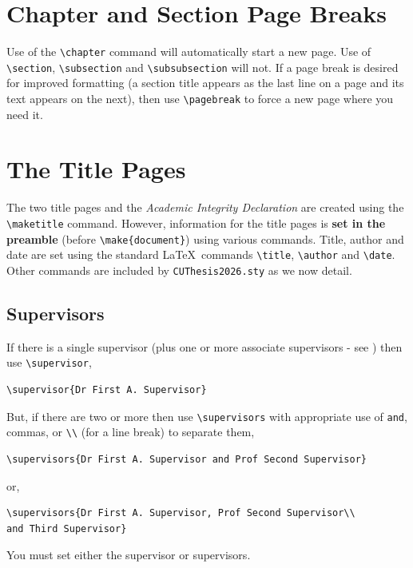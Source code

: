 \documentclass[12pt,oneside]{book} %
\begin{document}
\section{Chapter and Section Page Breaks}
\label{sec:ChapSecBreaks}
Use of the \verb#\chapter# command will automatically start a new page. Use of \verb#\section#, \verb#\subsection#  and \verb#\subsubsection# will not. If a page break is desired for improved formatting (\eg a section title appears as the last line on a page and its text appears on the next), then use \verb#\pagebreak# to force a new page where you need it.  

\section{The Title Pages}
\label{sec:TitlePages}
The two title pages and the {\em Academic Integrity Declaration} are created using the \linebreak\verb#\maketitle# command.  However, information for the title pages is \textbf{set in the preamble} (before \verb#\make{document}#) using various commands. Title, author and date are set  using the standard \LaTeX\ commands \verb#\title#, \verb#\author# and \verb#\date#. Other commands are included by \verb#CUThesis2026.sty# as we now detail.

\subsection{Supervisors}
\label{sec:Supervisor}
If there is a single supervisor (plus one or more associate supervisors - see ) then use \verb#\supervisor#,
\begin{verbatim}
\supervisor{Dr First A. Supervisor}
\end{verbatim}
But, if there are two or more then use \verb#\supervisors# with appropriate use of {\tt and}, commas, or \verb#\\# (for a line break)  to separate them,
\begin{verbatim}
\supervisors{Dr First A. Supervisor and Prof Second Supervisor}
\end{verbatim}
or,
\begin{verbatim}
\supervisors{Dr First A. Supervisor, Prof Second Supervisor\\ 
and Third Supervisor}
\end{verbatim}
You must set either the supervisor or supervisors. 
\end{document}
